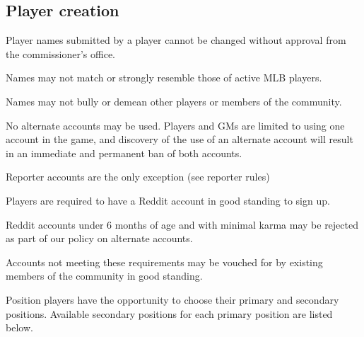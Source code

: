 \subsection{Player creation}
\begin{deepEnumerate}
      \item Player names submitted by a player cannot be changed
            without approval from the commissioner’s office.
            \begin{deepEnumerate}
                  \item Names may not match or strongly resemble those of active MLB players.
                  \item Names may not bully or demean other players or members of the community.
                  \item No alternate accounts may be used.
                        Players and GMs are limited to using one account in the game,
                        and discovery of the use of an alternate account
                        will result in an immediate and permanent ban of both accounts.
                        \begin{deepEnumerate}
                              \item Reporter accounts are the only exception (see reporter rules) %
                        \end{deepEnumerate}
            \end{deepEnumerate}
      \item Players are required to have a Reddit account in good standing to sign up.
            \begin{deepEnumerate}
                  \item Reddit accounts under 6 months of age and with minimal karma
                        may be rejected as part of our policy on alternate accounts.
                        \begin{deepEnumerate}
                              \item Accounts not meeting these requirements may be vouched for
                                    by existing members of the community in good standing.
                        \end{deepEnumerate}
            \end{deepEnumerate}
      \item Position players have the opportunity to choose their primary and secondary positions.
            Available secondary positions for each primary position are listed below.


\end{deepEnumerate}
